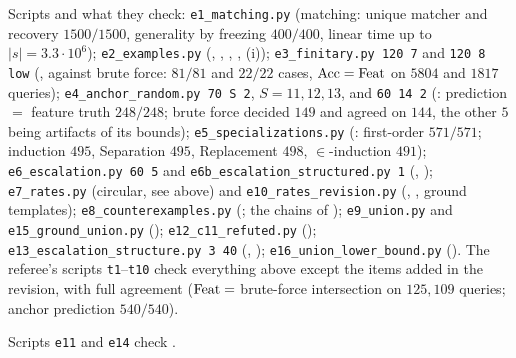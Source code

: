 \begin{sloppypar}
Scripts and what they check: \texttt{e1\_matching.py} (matching: unique matcher and recovery $1500/1500$, generality by freezing $400/400$, linear time up to $|s|=3.3\cdot10^6$); \texttt{e2\_examples.py} (, , , , (i)); \texttt{e3\_finitary.py 120 7} and \texttt{120 8 low} (,  against brute force: $81/81$ and $22/22$ cases, $\mathrm{Acc}=\mathrm{Feat}$ on $5804$ and $1817$ queries); \texttt{e4\_anchor\_random.py 70 S 2}, $S=11,12,13$, and \texttt{60 14 2} (: prediction $=$ feature truth $248/248$; brute force decided $149$ and agreed on $144$, the other $5$ being artifacts of its bounds); \texttt{e5\_specializations.py} (: first-order $571/571$; induction $495$, Separation $495$, Replacement $498$, $\in$-induction $491$); \texttt{e6\_escalation.py 60 5} and \texttt{e6b\_escalation\_structured.py 1} (, ); \texttt{e7\_rates.py} (circular, see above) and \texttt{e10\_rates\_revision.py} (, , ground templates); \texttt{e8\_counterexamples.py} (; the chains of ); \texttt{e9\_union.py} and \texttt{e15\_ground\_union.py} (); \texttt{e12\_c11\_refuted.py} (); \texttt{e13\_escalation\_structure.py 3 40} (, ); \texttt{e16\_union\_lower\_bound.py} (). The referee's scripts \texttt{t1}--\texttt{t10} check everything above except the items added in the revision, with full agreement ($\mathrm{Feat}=$ brute-force intersection on $125{,}109$ queries; anchor prediction $540/540$).
\end{sloppypar}

\noindent Scripts \texttt{e11} and \texttt{e14} check .
